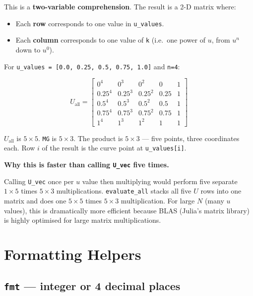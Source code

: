 \documentclass[12pt, a4paper]{article}
\newcommand{\cd}[1]{\texttt{#1}}
\begin{document}
This is a \textbf{two-variable comprehension}.
The result is a 2-D matrix where:
\begin{itemize}
  \item Each \textbf{row} corresponds to one value in \cd{u\_values}.
  \item Each \textbf{column} corresponds to one value of \cd{k}
        (i.e.\ one power of $u$, from $u^n$ down to $u^0$).
\end{itemize}

\begin{examplebox}
For \cd{u\_values = [0.0, 0.25, 0.5, 0.75, 1.0]} and \cd{n=4}:

\[
  U_{\text{all}} =
  \begin{bmatrix}
    0^4    & 0^3    & 0^2    & 0    & 1 \\
    0.25^4 & 0.25^3 & 0.25^2 & 0.25 & 1 \\
    0.5^4  & 0.5^3  & 0.5^2  & 0.5  & 1 \\
    0.75^4 & 0.75^3 & 0.75^2 & 0.75 & 1 \\
    1^4    & 1^3    & 1^2    & 1    & 1
  \end{bmatrix}
\]

$U_{\text{all}}$ is $5 \times 5$.
\cd{MG} is $5 \times 3$.
The product is $5 \times 3$ --- five points, three coordinates each.
Row $i$ of the result is the curve point at \cd{u\_values[i]}.
\end{examplebox}

\begin{notebox}
\textbf{Why this is faster than calling \cd{U\_vec} five times.}

Calling \cd{U\_vec} once per $u$ value then multiplying
would perform five separate $1 \times 5$ times $5 \times 3$
multiplications.
\cd{evaluate\_all} stacks all five $U$ rows into one matrix
and does one $5 \times 5$ times $5 \times 3$ multiplication.
For large $N$ (many $u$ values), this is dramatically more
efficient because BLAS (Julia's matrix library) is highly
optimised for large matrix multiplications.
\end{notebox}


\section{Formatting Helpers}

\subsection{\texttt{fmt} --- integer or 4 decimal places}
\end{document}
